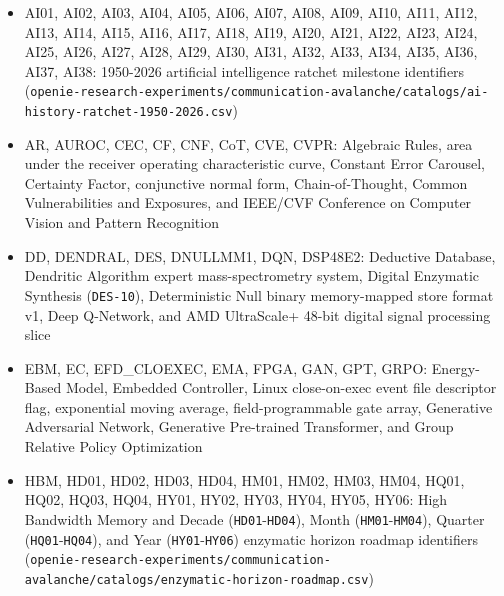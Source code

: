 \documentclass[10pt,letterpaper]{article}
\begin{document}
\begin{itemize}
  adenosine monophosphate, conventional continuous deep brain
  stimulation, cyclic guanosine monophosphate, extracellular
  nicotinamide phosphoribosyltransferase, functional near-infrared
  spectroscopy, human neural stem cell, human induced pluripotent stem
  cell, messenger RNA, mechanistic target of rapamycin, microRNA, small
  extracellular vesicle(s), transcranial alternating current
  stimulation, transcranial direct current stimulation, and transcranial
  focused ultrasound
\item
  AI01, AI02, AI03, AI04, AI05, AI06, AI07, AI08, AI09, AI10, AI11,
  AI12, AI13, AI14, AI15, AI16, AI17, AI18, AI19, AI20, AI21, AI22,
  AI23, AI24, AI25, AI26, AI27, AI28, AI29, AI30, AI31, AI32, AI33,
  AI34, AI35, AI36, AI37, AI38: 1950-2026 artificial intelligence
  ratchet milestone identifiers
  (\texttt{openie-\allowbreak{}research-\allowbreak{}experiments/\allowbreak{}communication-\allowbreak{}avalanche/\allowbreak{}catalogs/\allowbreak{}ai-\allowbreak{}history-\allowbreak{}ratchet-\allowbreak{}1950-\allowbreak{}2026.\allowbreak{}csv})
\item
  AR, AUROC, CEC, CF, CNF, CoT, CVE, CVPR: Algebraic Rules, area under
  the receiver operating characteristic curve, Constant Error Carousel,
  Certainty Factor, conjunctive normal form, Chain-of-Thought, Common
  Vulnerabilities and Exposures, and IEEE/CVF Conference on Computer
  Vision and Pattern Recognition
\item
  DD, DENDRAL, DES, DNULLMM1, DQN, DSP48E2: Deductive Database,
  Dendritic Algorithm expert mass-spectrometry system, Digital Enzymatic
  Synthesis (\texttt{DES-10}), Deterministic Null binary memory-mapped
  store format v1, Deep Q-Network, and AMD UltraScale+ 48-bit digital
  signal processing slice
\item
  EBM, EC, EFD\_CLOEXEC, EMA, FPGA, GAN, GPT, GRPO: Energy-Based Model,
  Embedded Controller, Linux close-on-exec event file descriptor flag,
  exponential moving average, field-programmable gate array, Generative
  Adversarial Network, Generative Pre-trained Transformer, and Group
  Relative Policy Optimization
\item
  HBM, HD01, HD02, HD03, HD04, HM01, HM02, HM03, HM04, HQ01, HQ02, HQ03,
  HQ04, HY01, HY02, HY03, HY04, HY05, HY06: High Bandwidth Memory and
  Decade (\texttt{HD01}-\texttt{HD04}), Month
  (\texttt{HM01}-\texttt{HM04}), Quarter (\texttt{HQ01}-\texttt{HQ04}),
  and Year (\texttt{HY01}-\texttt{HY06}) enzymatic horizon roadmap
  identifiers
  (\texttt{openie-\allowbreak{}research-\allowbreak{}experiments/\allowbreak{}communication-\allowbreak{}avalanche/\allowbreak{}catalogs/\allowbreak{}enzymatic-\allowbreak{}horizon-\allowbreak{}roadmap.\allowbreak{}csv})

\end{itemize}
\end{document}
